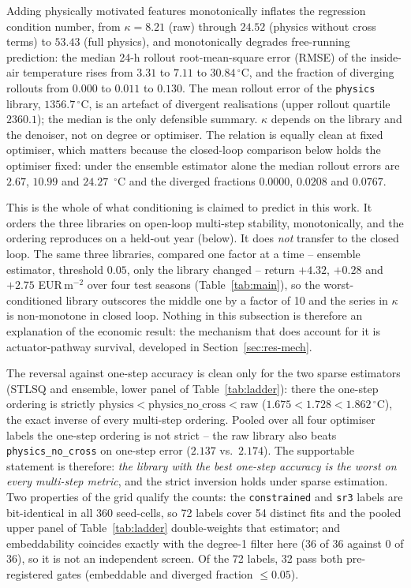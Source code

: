 Adding physically motivated features monotonically inflates the regression condition
number, from $\kappa=8.21$ (raw) through $24.52$ (physics without cross terms) to $53.43$
(full physics), and monotonically degrades free-running prediction: the median 24-h
rollout root-mean-square error (RMSE) of the inside-air temperature rises from $3.31$ to $7.11$ to $30.84\,^\circ$C,
and the fraction of diverging rollouts from $0.000$ to $0.011$ to $0.130$. The mean
rollout error of the \texttt{physics} library, $1356.7\,^\circ$C, is an artefact of
divergent realisations (upper rollout quartile $2360.1$); the median is the only defensible
summary. $\kappa$ depends on the library and the denoiser, not on degree or optimiser. The
relation is equally clean at fixed optimiser, which matters because the closed-loop
comparison below holds the optimiser fixed: under the ensemble estimator alone the median
rollout errors are $2.67$, $10.99$ and $24.27$~$^\circ$C and the diverged fractions
$0.0000$, $0.0208$ and $0.0767$.

This is the whole of what conditioning is claimed to predict in this work. It orders the
three libraries on open-loop multi-step stability, monotonically, and the ordering
reproduces on a held-out year (below). It does \emph{not} transfer to the closed loop. The
same three libraries, compared one factor at a time -- ensemble estimator, threshold
$0.05$, only the library changed -- return $+4.32$, $+0.28$ and $+2.75$ EUR\,m$^{-2}$ over
four test seasons (Table~\ref{tab:main}), so the worst-conditioned library outscores the
middle one by a factor of 10 and the series in $\kappa$ is non-monotone in closed loop.
Nothing in this subsection is therefore an explanation of the economic result: the
mechanism that does account for it is actuator-pathway survival, developed in
Section~\ref{sec:res-mech}.

The reversal against one-step accuracy is clean only for the two sparse estimators
(STLSQ and ensemble, lower panel of Table~\ref{tab:ladder}): there the one-step ordering
is strictly $\text{physics} < \text{physics\_no\_cross} < \text{raw}$
($1.675 < 1.728 < 1.862\,^\circ$C), the exact inverse of every multi-step ordering.
Pooled over all four optimiser labels the one-step ordering is not strict -- the raw
library also beats \texttt{physics\_no\_cross} on one-step error ($2.137$ vs.\ $2.174$).
The supportable statement is therefore: \emph{the library with the best one-step accuracy
is the worst on every multi-step metric}, and the strict inversion holds under sparse
estimation. Two properties of the grid qualify the counts: the \texttt{constrained} and
\texttt{sr3} labels are bit-identical in all 360 seed-cells, so 72 labels cover 54 distinct
fits and the pooled upper panel of Table~\ref{tab:ladder} double-weights that estimator;
and embeddability coincides exactly with the degree-1 filter here (36 of 36 against
0 of 36), so it is not an independent screen. Of the 72 labels, 32 pass both
pre-registered gates (embeddable and diverged fraction $\le 0.05$).

